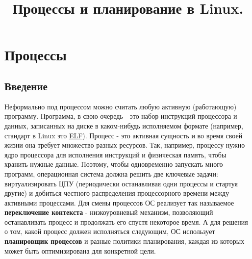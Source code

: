 \documentclass{article}
\title{Процессы и планирование в Linux.}
\begin{document}
\maketitle

\section{Процессы}

\subsection{Введение}
Неформально под процессом можно считать любую активную (работающую) программу. Программа, в свою очередь - это набор инструкций процессора и данных, записанных на диске в каком-нибудь исполняемом формате (например, стандарт в Linux это \href{https://refspecs.linuxfoundation.org/elf/elf.pdf}{ELF}). 
\bigbreak
Процесс - это активная сущность и во время своей жизни она требует множество разных ресурсов. Так, например, процессу нужно ядро процессора для исполнения инструкций и физическая память, чтобы хранить нужные данные. Поэтому, чтобы одновременно запускать много программ, операционная система должна решить две ключевые задачи: виртуализировать ЦПУ (периодически останавливая одни процессы и стартуя другие) и добиться честного распределения процессорного времени между активными процессами. 
\bigbreak
Для смены процессов ОС реализует так называемое \textbf{переключение контекста} - низкоуровневый механизм, позволяющий останавливать процесс и продолжать его спустя некоторое время. А для решения о том, какой процесс должен исполняться следующим, ОС использует \textbf{планировщик процессов} и разные политики планирования, каждая из которых может быть оптимизирована для конкретной цели.
\bigbreak
\end{document}
